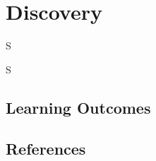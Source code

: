 \frenchspacing
\chapter{Discovery}
\epigraph{S}{S}

%
\section{Learning Outcomes}

%
\section{References}
